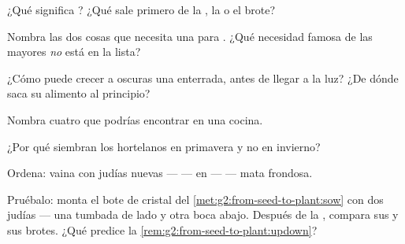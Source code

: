 \begin{exercise}[$\star$]\label{exo:g2:from-seed-to-plant:2}
¿Qué significa \emph{}? ¿Qué sale primero de la , la
 o el brote?
\end{exercise}

\begin{exercise}[$\star$]\label{exo:g2:from-seed-to-plant:3}
Nombra las dos cosas que necesita una  para . ¿Qué
necesidad famosa de las  mayores \emph{no} está en la lista?
\end{exercise}

\begin{exercise}[$\star$]\label{exo:g2:from-seed-to-plant:4}
¿Cómo puede crecer a oscuras una  enterrada, antes de llegar a
la luz? ¿De dónde saca su alimento al principio?
\end{exercise}

\begin{exercise}[$\star$]\label{exo:g2:from-seed-to-plant:5}
Nombra cuatro  que podrías encontrar en una cocina.
\end{exercise}

\begin{exercise}[$\star$]\label{exo:g2:from-seed-to-plant:6}
¿Por qué siembran los hortelanos en primavera y no en invierno?
\end{exercise}

\begin{exercise}[$\star$]\label{exo:g2:from-seed-to-plant:7}
Ordena: vaina con judías nuevas ---  ---  en  ---
 --- mata frondosa.
\end{exercise}

\begin{exercise}[$\star$]\label{exo:g2:from-seed-to-plant:8}
Pruébalo: monta el bote de cristal del
\cref{met:g2:from-seed-to-plant:sow} con dos judías --- una tumbada de
lado y otra boca abajo. Después de la , compara sus 
y sus brotes. ¿Qué predice la \cref{rem:g2:from-seed-to-plant:updown}?
\end{exercise}

